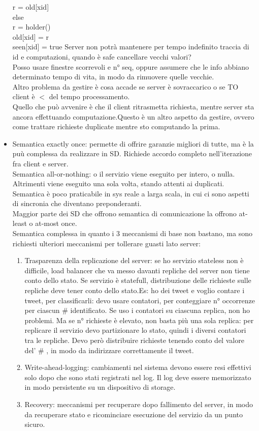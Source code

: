 \documentclass{article}
\begin{document}
\begin{itemize}
	r = old[xid]\\
else\\
	r = holder()\\
	old[xid] = r\\
	seen[xid] = true
Server non potrà mantenere per tempo indefinito traccia di id e computazioni, quando è safe cancellare vecchi valori?\\Posso usare finestre scorrevoli e n° seq, oppure assumere che le info abbiano determinato tempo di vita, in modo da rimuovere quelle vecchie.\\Altro problema da gestire è cosa accade se server è sovraccarico o se TO client è $<$ del tempo processamento.\\Quello che può avvenire è che il client ritrasmetta richiesta, mentre server sta ancora effettuando computazione.Questo è un altro aspetto da gestire, ovvero come trattare richieste duplicate mentre sto computando la prima.
\item Semantica exactly once: permette di offrire garanzie migliori di tutte, ma è la puù complessa da realizzare in SD. Richiede accordo completo nell'iterazione fra client e server.\\Semantica all-or-nothing: o il servizio viene eseguito per intero, o nulla. Altrimenti viene eseguito una sola volta, stando attenti ai duplicati. Semantica è poco praticabile in sys reale a larga scala, in cui ci sono aspetti di sincronia che diventano preponderanti.\\Maggior parte dei SD che offrono semantica di comunicazione la offrono at-least o at-most once.\\Semantica complessa in quanto i 3 meccanismi di base non bastano, ma sono richiesti ulteriori meccanismi per tollerare guasti lato server:
\begin{enumerate}
\item Trasparenza della replicazione del server: se ho servizio stateless non è difficile, load balancer che va messo davanti repliche del server non tiene conto dello stato. Se servizio è statefull, distribuzione delle richieste sulle repliche deve tener conto dello stato.Es: ho dei tweet e voglio contare i tweet, per classificarli: devo usare contatori, per conteggiare n° occorrenze per ciascun \# identificato. Se uso i contatori su ciascuna replica, non ho problemi. Ma se n° richieste è elevato, non basta più una sola replica: per replicare il servizio devo partizionare lo stato, quindi i diversi contatori tra le repliche. Devo però distribuire richieste tenendo conto del valore del' \# , in modo da indirizzare correttamente il tweet.
\item Write-ahead-logging: cambiamenti nel sistema devono essere resi effettivi solo dopo che sono stati registrati nel log. Il log deve essere memorizzato in modo persistente su un dispositivo di storage.
\item Recovery: meccanismi per recuperare dopo fallimento del server, in modo da recuperare stato e ricominciare esecuzione del servizio da un punto sicuro.
\end{enumerate}
\end{itemize}
\end{document}
